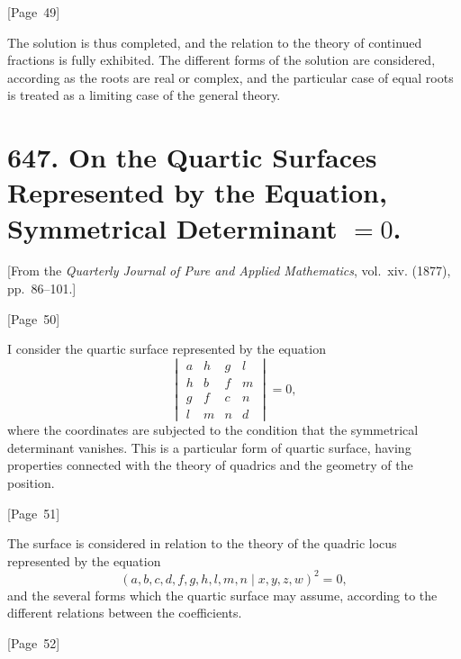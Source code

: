 \documentclass[11pt,a4paper]{article}
\theoremstyle{plain}
\theoremstyle{definition}
\theoremstyle{remark}
\begin{document}
\begin{center}
[Page~49]
\end{center}

The solution is thus completed, and the relation to the theory of
continued fractions is fully exhibited. The different forms of the
solution are considered, according as the roots are real or complex,
and the particular case of equal roots is treated as a limiting case
of the general theory.


\newpage
\section*{647. On the Quartic Surfaces Represented by the Equation, Symmetrical Determinant $=0$.}

[From the \textit{Quarterly Journal of Pure and Applied Mathematics},
vol.~xiv. (1877), pp.~86--101.]

\begin{center}
[Page~50]
\end{center}

I consider the quartic surface represented by the equation
\[
\begin{vmatrix}
a & h & g & l \\
h & b & f & m \\
g & f & c & n \\
l & m & n & d
\end{vmatrix} = 0,
\]
where the coordinates are subjected to the condition that the
symmetrical determinant vanishes. This is a particular form of quartic
surface, having properties connected with the theory of quadrics and
the geometry of the position.

\begin{center}
[Page~51]
\end{center}

The surface is considered in relation to the theory of the quadric
locus represented by the equation
\[
(a,b,c,d,f,g,h,l,m,n\mid x,y,z,w)^2 = 0,
\]
and the several forms which the quartic surface may assume, according
to the different relations between the coefficients.

\begin{center}
[Page~52]
\end{center}
\end{document}
